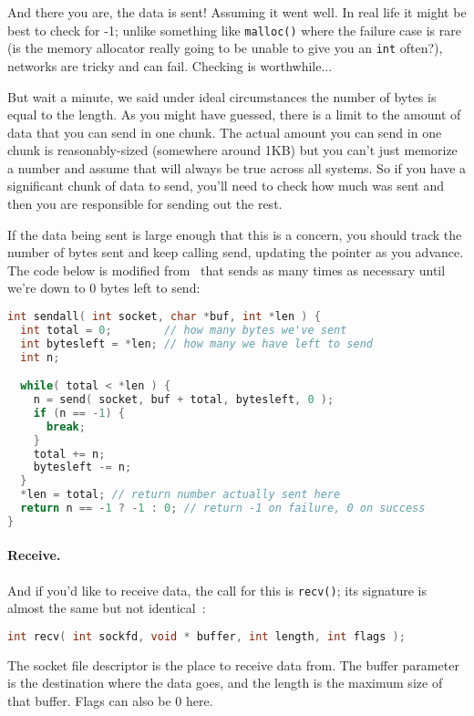 And there you are, the data is sent! Assuming it went well. In real life it might be best to check for -1; unlike something like \texttt{malloc()} where the failure case is rare (is the memory allocator really going to be unable to give you an \texttt{int} often?), networks are tricky and can fail. Checking is worthwhile...

But wait a minute, we said under ideal circumstances the number of bytes is equal to the length. As you might have guessed, there is a limit to the amount of data that you can send in one chunk. The actual amount you can send in one chunk is reasonably-sized (somewhere around 1KB) but you can't just memorize a number and assume that will always be true across all systems. So if you have a significant chunk of data to send, you'll need to check how much was sent and then you are responsible for sending out the rest.

If the data being sent is large enough that this is a concern, you should track the number of bytes sent and keep calling send, updating the pointer as you advance. The code below is modified from~\cite{getaddrinfo} that sends as many times as necessary until we're down to 0 bytes left to send:

\begin{lstlisting}[language=C]
int sendall( int socket, char *buf, int *len ) {
  int total = 0;        // how many bytes we've sent
  int bytesleft = *len; // how many we have left to send
  int n;

  while( total < *len ) {
    n = send( socket, buf + total, bytesleft, 0 );
    if (n == -1) { 
      break; 
    }
    total += n;
    bytesleft -= n;
  }
  *len = total; // return number actually sent here
  return n == -1 ? -1 : 0; // return -1 on failure, 0 on success
}
\end{lstlisting}

\paragraph{Receive.} And if you'd like to receive data, the call for this is \texttt{recv()}; its signature is almost the same but not identical~\cite{apunix}:

\begin{lstlisting}[language=C]
int recv( int sockfd, void * buffer, int length, int flags );
\end{lstlisting}

The socket file descriptor is the place to receive data from. The buffer parameter is the destination where the data goes, and the length is the maximum size of that buffer. Flags can also be 0 here. 

